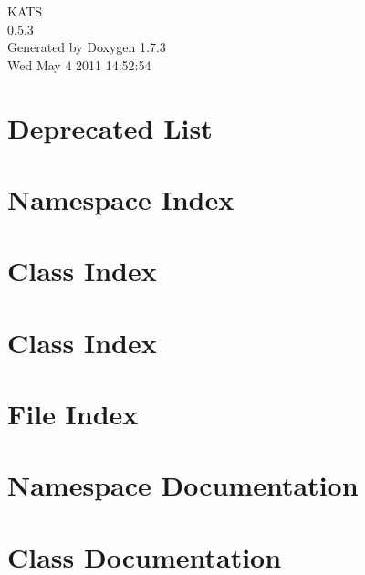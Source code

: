 \documentclass[a4paper]{book}
\begin{document}
\hypersetup{pageanchor=false}
\begin{titlepage}
\vspace*{7cm}
\begin{center}
{\Large KATS \\[1ex]\large 0.5.3 }\\
\vspace*{1cm}
{\large Generated by Doxygen 1.7.3}\\
\vspace*{0.5cm}
{\small Wed May 4 2011 14:52:54}\\
\end{center}
\end{titlepage}
\clearemptydoublepage
{}
\tableofcontents
\clearemptydoublepage
{}
\hypersetup{pageanchor=true}
\chapter{Deprecated List}
\label{deprecated}
\hypertarget{deprecated}{}

\chapter{Namespace Index}

\chapter{Class Index}

\chapter{Class Index}

\chapter{File Index}

\chapter{Namespace Documentation}


\chapter{Class Documentation}























\end{document}
